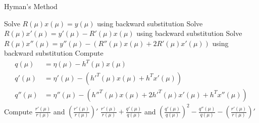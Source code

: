 \documentclass{article}
\begin{document}
\begin{algorithm}[h]
\caption{Hyman's Method}
\begin{algorithmic}
\STATE Solve $R(\mu)x(\mu)=y(\mu)$ using backward substitution
\STATE Solve $R(\mu)x'(\mu)=y'(\mu)-R'(\mu)x(\mu)$ using backward substitution
\STATE Solve $R(\mu)x''(\mu)=y''(\mu)-\left(R''(\mu)x(\mu)+2R'(\mu)x'(\mu)\right)$ using backward substitution
\STATE Compute
		\begin{align*}
		q(\mu) &= \eta(\mu)-h^{T}(\mu)x(\mu) \\
		q'(\mu) &= \eta'(\mu)-\left(h'^{T}(\mu)x(\mu)+h^{T}x'(\mu)\right) \\
		q''(\mu) &= \eta''(\mu)-\left(h''^{T}(\mu)x(\mu)+2h'^{T}(\mu)x'(\mu)+h^{T}x''(\mu)\right)
		\end{align*}
\STATE Compute $\frac{r'(\mu)}{r(\mu)}$ and $\left(\frac{r'(\mu)}{r(\mu)}\right)'$
\RETURN  $\frac{r'(\mu)}{r(\mu)} + \frac{q'(\mu)}{q(\mu)}$ and $\left(\frac{q'(\mu)}{q(\mu)}\right)^{2} - \frac{q''(\mu)}{q(\mu)} - \left(\frac{r'(\mu)}{r(\mu)}\right)'$
\end{algorithmic}
\label{alg: hym}
\end{algorithm}

\end{document}
